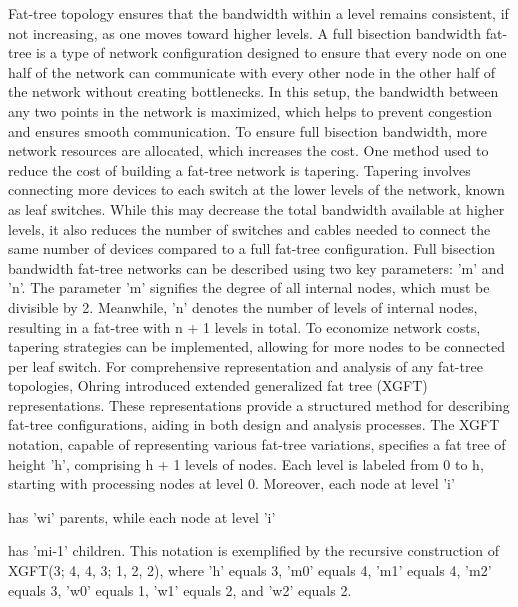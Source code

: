 Fat-tree topology ensures that the bandwidth within a level
remains consistent, if not increasing, as one moves toward higher levels\cite{leiserson1985fat, jain2017predicting}.  A
full bisection bandwidth fat-tree is a type of network configuration designed to
ensure that every node on one half of the network can communicate with every
other node in the other half of the network without creating bottlenecks. In
this setup, the bandwidth between any two points in the network is maximized,
which helps to prevent congestion and ensures smooth communication. To ensure
full bisection bandwidth, more network resources are allocated, which increases
the cost.  One method used to reduce the cost of building a fat-tree network is
tapering. Tapering involves connecting more devices to each switch at the lower
levels of the network, known as leaf switches. While this may decrease the total
bandwidth available at higher levels, it also reduces the number of switches and
cables needed to connect the same number of devices compared to a full fat-tree
configuration.  Full bisection bandwidth fat-tree networks can be described
using two key parameters: 'm' and 'n'. The parameter 'm' signifies the degree of
all internal nodes, which must be divisible by 2. Meanwhile, 'n' denotes the
number of levels of internal nodes, resulting in a fat-tree with n + 1 levels in
total\cite{leiserson1985fat}.  To economize network costs, tapering strategies can be implemented,
allowing for more nodes to be connected per leaf switch. For
comprehensive representation and analysis of any fat-tree topologies, Ohring
introduced extended generalized fat tree (XGFT) representations\cite{ohring1995generalized}. These
representations provide a structured method for describing fat-tree
configurations, aiding in both design and analysis processes. The XGFT notation,
capable of representing various fat-tree variations, specifies a fat tree of
height 'h', comprising h + 1 levels of nodes. Each level is labeled from 0 to h,
starting with processing nodes at level 0. Moreover, each node at level 'i' 

has 'wi' parents, while each node at level 'i' 

has 'mi-1'
children. This notation is exemplified by the recursive construction of XGFT(3;
4, 4, 3; 1, 2, 2), where 'h' equals 3, 'm0' equals 4, 'm1' equals 4, 'm2' equals
3, 'w0' equals 1, 'w1' equals 2, and 'w2' equals 2.  

